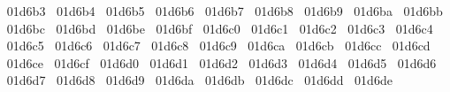 {  ^^^^^^01d6b3%
  ^^^^^^01d6b4%
  ^^^^^^01d6b5%
  ^^^^^^01d6b6%
  ^^^^^^01d6b7%
  ^^^^^^01d6b8%
  ^^^^^^01d6b9%
  ^^^^^^01d6ba%
  ^^^^^^01d6bb%
  ^^^^^^01d6bc%
  ^^^^^^01d6bd%
  ^^^^^^01d6be%
  ^^^^^^01d6bf%
  ^^^^^^01d6c0%
  ^^^^^^01d6c1%
  ^^^^^^01d6c2%
  ^^^^^^01d6c3%
  ^^^^^^01d6c4%
  ^^^^^^01d6c5%
  ^^^^^^01d6c6%
  ^^^^^^01d6c7%
  ^^^^^^01d6c8%
  ^^^^^^01d6c9%
  ^^^^^^01d6ca%
  ^^^^^^01d6cb%
  ^^^^^^01d6cc%
  ^^^^^^01d6cd%
  ^^^^^^01d6ce%
  ^^^^^^01d6cf%
  ^^^^^^01d6d0%
  ^^^^^^01d6d1%
  ^^^^^^01d6d2%
  ^^^^^^01d6d3%
  ^^^^^^01d6d4%
  ^^^^^^01d6d5%
  ^^^^^^01d6d6%
  ^^^^^^01d6d7%
  ^^^^^^01d6d8%
  ^^^^^^01d6d9%
  ^^^^^^01d6da%
  ^^^^^^01d6db%
  ^^^^^^01d6dc%
  ^^^^^^01d6dd%
  ^^^^^^01d6de%
}
